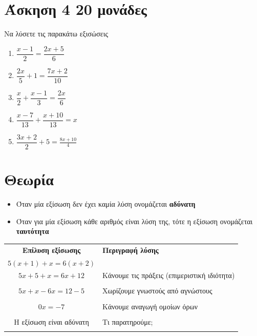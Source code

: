 \documentclass[a4paper,10pt]{report}
\begin{document}
\section*{Άσκηση 4  \hfill \small{20 μονάδες}}
Να λύσετε τις παρακάτω εξισώσεις
\begin{enumerate}[1)]
 \item $\dfrac{x-1}{2}=\dfrac{2x+5}{6}$
 \item $\dfrac{2x}{5}+1=\dfrac{7x+2}{10}$
 \item $\dfrac{x}{2}+\dfrac{x-1}{3}=\dfrac{2x}{6}$
 \item $\dfrac{x-7}{13}+\dfrac{x+10}{13}=x$
 \item $\dfrac{3x+2}{2}+5=\frac{8x+10}{4}$
\end{enumerate}
\section*{Θεωρία \hfill \small{}}
\begin{itemize}
 \item Όταν μία εξίσωση δεν έχει καμία λύση ονομάζεται \textbf{αδύνατη}
 \item Όταν για μία εξίσωση κάθε αριθμός είναι λύση της, τότε η εξίσωση ονομάζεται \textbf{ταυτότητα}
\end{itemize}
\vspace{3em}
\begin{center}
 \begin{tabular}{|c|l|}\hline 
\textbf{Επίλυση εξίσωσης} \quad        &    \textbf{Περιγραφή λύσης}       \\
$5(x+1)+x=6(x+2)$     \quad \quad                 &         \\
\hline 
$5x+5+x=6x+12$                                  & Κάνουμε τις πράξεις (επιμεριστική ιδιότητα)\\ 
                                  & \\                               
\hline
$5x+x-6x=12-5$                                  &  Χωρίζουμε γνωστούς από αγνώστους        \\
                                  & \\                               
 
\hline
$0x=-7$                                  & Κάνουμε αναγωγή ομοίων όρων       \\
                                  & \\
\hline
Η εξίσωση είναι αδύνατη                                  &  Τι παρατηρούμε;     \\
                                  & \\  
\hline 
\end{tabular}
\end{center}
\end{document}
